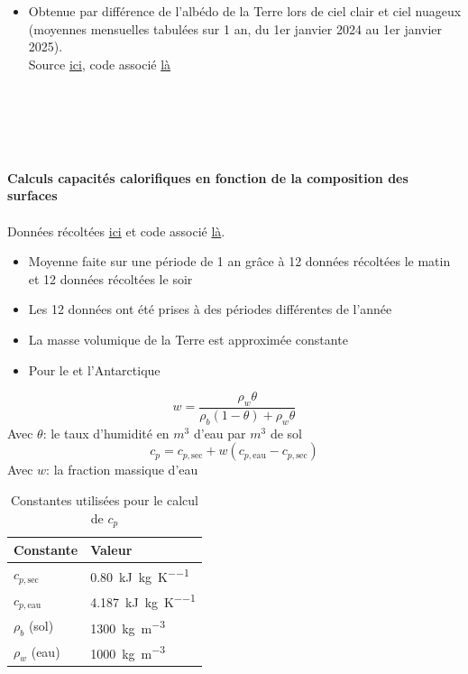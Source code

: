 \documentclass[a4paper,12pt]{article}
\begin{document}
\begin{itemize}
  \item Obtenue par différence de l'albédo de la Terre lors de ciel clair et ciel nuageux (moyennes mensuelles tabulées sur 1 an, du 1er janvier 2024 au 1er janvier 2025).
\\
{Source} \href{https://ceres-tool.larc.nasa.gov/ord-tool/jsp/EBAFTOA421Selection.jsp}{ici}, code associé \href{https://github.com/pierrelouis-cmrt/CREPES/blob/main/archive/para_spaciaux/albedo/albedo_nuages_jour.py}{là}
\end{itemize}
\\
\\
\\
\\
\textbf{Calculs capacités calorifiques en fonction de la composition des surfaces}
\\
\\
Données récoltées \href{https://data.catds.fr/cpdc/Land_products/GRIDDED/L4SM/OPER/}{ici} et code associé \href{https://github.com/pierrelouis-cmrt/CREPES/blob/main/ressources/Cp_humidity/ZZ_cp.py}{là}.


\begin{itemize}
    \item Moyenne faite sur une période de 1 an grâce à 12 données récoltées le matin et 12 données récoltées le soir 
    \item Les 12 données ont été prises à des périodes différentes de l'année 
    \item La masse volumique de la Terre est approximée constante 
    \item Pour le  et l’Antarctique  
\end{itemize}
\[
w = \frac{\rho_w \theta}{\rho_b (1 - \theta) + \rho_w \theta}
\]
Avec \(\theta\): le taux d'humidité en \(m^3\) d'eau par \(m^3\) de sol 
\[
c_p = c_{p,\text{sec}} + w (c_{p,\text{eau}} - c_{p,\text{sec}})
\]
Avec \(w\): la fraction massique d'eau 
\begin{table}[h!]
\centering
\begin{tabular}{ll}
\textbf{Constante} & \textbf{Valeur} \\
\hline
$c_{p,\text{sec}}$ & \SI{0.80}{\kilo\joule\per\kilogram\per\kelvin} \\
$c_{p,\text{eau}}$ & \SI{4.187}{\kilo\joule\per\kilogram\per\kelvin} \\
$\rho_b$ (sol) & \SI{1300}{\kilogram\per\cubic\metre} \\
$\rho_w$ (eau) & \SI{1000}{\kilogram\per\cubic\metre} \\
\end{tabular}
\caption*{Constantes utilisées pour le calcul de $c_p$}
\vspace{1cm}
\end{table}
\end{document}
